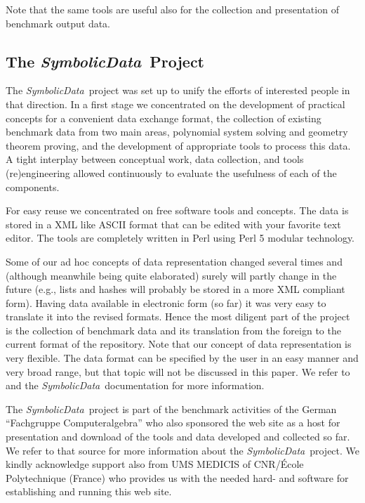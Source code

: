 \documentclass[11pt]{article}
\newcommand{\SD}{{\it Symbo\-lic\-Data}}
\begin{document}
Note that the same tools are useful also for the collection and
presentation of benchmark output data.

\subsection{The \SD\ Project}

The \SD\ project was set up to unify the efforts of interested people
in that direction.  In a first stage we concentrated on the
development of practical concepts for a convenient data exchange
format, the collection of existing benchmark data from two main areas,
polynomial system solving and geometry theorem proving, and the
development of appropriate tools to process this data.  A tight
interplay between conceptual work, data collection, and tools
(re)engineering allowed continuously to evaluate the usefulness of
each of the components.

For easy reuse we concentrated on free software tools and
concepts.  The data is stored in a XML like ASCII format that can
be edited with your favorite text editor.  The tools are
completely written in Perl using Perl 5 modular technology.  

Some of our ad hoc concepts of data representation changed several
times and (although meanwhile being quite elaborated) surely will
partly change in the future (e.g., lists and hashes will probably be
stored in a more XML compliant form). Having data available in
electronic form (so far) it was very easy to translate it into the
revised formats. Hence the most diligent part of the project is the
collection of benchmark data and its translation from the foreign to
the current format of the repository.  Note that our concept of data
representation is very flexible. The data format can be specified by
the user in an easy manner and very broad range, but that topic will
not be discussed in this paper.  We refer to \cite{Bachmann_00a,
karlsruhe-02} and the \SD\ documentation for more information.
\medskip

The \SD\ project is part of the benchmark activities of the
German ``Fachgruppe Computeralgebra'' who also sponsored the web
site \cite{SymbolicData} as a host for presentation and download
of the tools and data developed and collected so far.  We refer
to that source for more information about the \SD\ project.  We
kindly acknowledge support also from UMS MEDICIS of CNR/\'Ecole
Polytechnique (France) who provides us with the needed hard-
and software for establishing and running this web site.
\medskip
\end{document}
